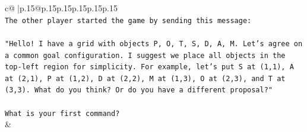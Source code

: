 \documentclass{article}
\begin{document}
{\begin{supertabular}{c@{$\;$}|p{.15\linewidth}@{}p{.15\linewidth}p{.15\linewidth}p{.15\linewidth}p{.15\linewidth}p{.15\linewidth}}
{{{\\ 
\texttt{The other player started the game by sending this message:} \\
\\ 
\texttt{"Hello! I have a grid with objects P, O, T, S, D, A, M. Let's agree on a common goal configuration. I suggest we place all objects in the top{-}left region for simplicity. For example, let's put S at (1,1), A at (2,1), P at (1,2), D at (2,2), M at (1,3), O at (2,3), and T at (3,3). What do you think? Or do you have a different proposal?"} \\
\\ 
\texttt{What is your first command?} \\
            }
        }
    }
    & \\ \\


\end{supertabular}}
\end{document}
